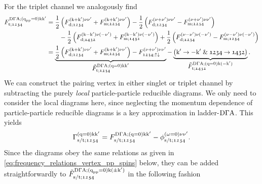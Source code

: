 \documentclass[main.tex]{subfiles}
\begin{document}
For the triplet channel we analogously find
\begin{align}
\begin{split}
	F_{\text{t};\mathfrak{1234}}^{\text{D}\Gamma\text{A};(\text{q}_{\text{pp}}=0)\text{k}\text{k}'}&=\frac12\left (F_{\text{d};\mathfrak{1234}}^{(\text{k}+\text{k}')\nu\nu'}+F_{\text{m};\mathfrak{1234}}^{(\text{k}+\text{k}')\nu\nu'}\right )-\frac12\left (F_{\text{d};\mathfrak{1234}}^{(\nu+\nu')\nu\nu'}-F_{\text{m};\mathfrak{1234}}^{(\nu+\nu')\nu\nu'}\right )\\
	&\qquad-\frac12\left (F_{\text{d};\mathfrak{1432}}^{(\text{k}-\text{k}')\nu(-\nu')}+F_{\text{m};\mathfrak{1432}}^{(\text{k}-\text{k}')\nu(-\nu')}\right )+\frac12\left (F_{\text{d};\mathfrak{1234}}^{(\nu-\nu')\nu(-\nu')}-F_{\text{m};\mathfrak{1234}}^{(\nu-\nu')\nu(-\nu')}\right )\\
	&=\underbrace{\frac12\left (F_{\text{d};\mathfrak{1234}}^{(\text{k}+\text{k}')\nu\nu'}+F_{\text{m};\mathfrak{1234}}^{(\text{k}+\text{k}')\nu\nu'}\right )-F_{\mathfrak{1234};\uparrow\downarrow}^{(\nu+\nu')\nu\nu'}}_{\textstyle\tilde{F}_{\text{t};\mathfrak{1234}}^{\text{D}\Gamma\text{A};(\text{q}=0)\text{k}\text{k}'}}-\underbrace{\left (\text{k}'\rightarrow -\text{k}'\;\&\; \mathfrak{1234}\rightarrow\mathfrak{1432}\right )}_{\textstyle\tilde{F}_{\text{t};\mathfrak{1432}}^{\text{D}\Gamma\text{A};(\text{q}=0)\text{k}(-\text{k}')}}.
\end{split}
\end{align}
We can construct the pairing vertex in either singlet or triplet channel by subtracting the purely \textit{local} particle-particle reducible diagrams. We only need to consider the local diagrams here, since neglecting the momentum dependence of particle-particle reducible diagrams is a key approximation in ladder-$\text{D}\Gamma\text{A}$. This yields
\begin{align}
	\Gamma_{\text{s}/\text{t};\mathfrak{1234}}^{(\text{q}=0)\text{k}\text{k}'}=F_{\text{s}/\text{t};\mathfrak{1234}}^{\text{D}\Gamma\text{A};(\text{q}=0)\text{k}\text{k}'}-\phi_{\text{s}/\text{t};\mathfrak{1234}}^{(\omega=0)\nu\nu'}.
\end{align}
Since the diagrams obey the same relations as given in \eqref{eq:frequency_relations_vertex_pp_spins} below, they can be added straightforwardly to $\tilde{F}_{\text{s}/\text{t};\mathfrak{1234}}^{\text{D}\Gamma\text{A};(\text{q}_{\text{pp}}=0)\text{k}(\pm\text{k}')}$ in the following fashion
\end{document}
